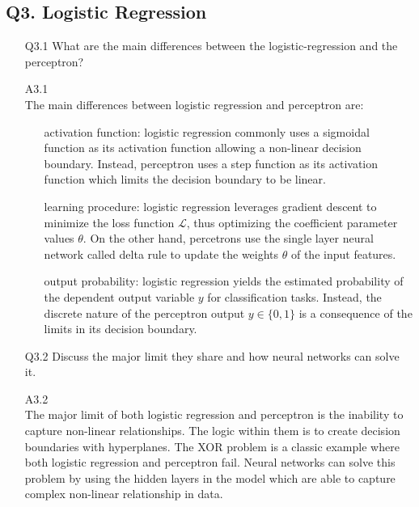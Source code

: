 \documentclass[unicode, 11pt, a4paper]{scrartcl}
\begin{document}
\subsection*{Q3. Logistic Regression}
\begin{itemize}
	\item[Q3.1] What are the main differences between the logistic-regression and the perceptron?

	\item[A3.1] ~\\
	      The main differences between logistic regression and perceptron are:
	      \begin{itemize}
		      \item[] activation function:
		            logistic regression commonly uses a sigmoidal function as its activation function
		            allowing a non-linear decision boundary.
		            Instead, perceptron uses a step function as its activation function which
		            limits the decision boundary to be linear.

		      \item[] learning procedure:
		            logistic regression leverages gradient descent to minimize the loss function
		            $\mathcal{L}$, thus optimizing the coefficient parameter values $\theta$.
		            On the other hand, percetrons use the single layer neural network called
		            delta rule to update the weights $\theta$ of the input features.

		      \item[] output probability:
		            logistic regression yields the estimated probability of the dependent output variable
		            $y$ for classification tasks.
		            Instead, the discrete nature of the perceptron output $y \in \{ 0, 1 \}$
		            is a consequence of the limits in its decision boundary.
	      \end{itemize}

	\item[Q3.2] Discuss the major limit they share and how neural networks can solve it.

	\item[A3.2] ~\\
		The major limit of both logistic regression and perceptron is the inability 
		to capture non-linear relationships.
		The logic within them is to create decision boundaries with hyperplanes.
		The XOR problem is a classic example where both logistic regression and perceptron fail.
		Neural networks can solve this problem by using the hidden layers in the model 
		which are able to capture complex non-linear relationship in data.


\end{itemize}
\end{document}
